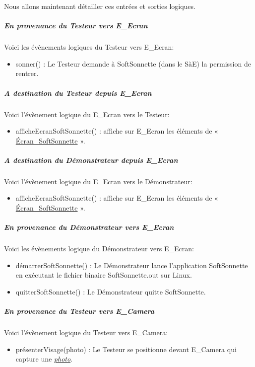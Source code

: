 Nous allons maintenant détailler ces entrées et sorties logiques.

\subparagraph{\textit{En provenance du Testeur vers E\_Ecran}} 
\noindent Voici les évènements logiques du Testeur vers E\_Ecran:

    \begin{itemize}
        \item sonner() : Le Testeur demande à SoftSonnette (dans le SàE) la permission de rentrer.
    \end{itemize}

\subparagraph{\textit{A destination du Testeur depuis E\_Ecran}} 
\noindent Voici l'évènement logique du E\_Ecran vers le Testeur:

    \begin{itemize}
        \item afficheEcranSoftSonnette() : affiche sur E\_Ecran les éléments de « \hyperlink{EcranWebcamConnec}{Écran\_SoftSonnette} ».
    \end{itemize}

\subparagraph{\textit{A destination du Démonstrateur depuis E\_Ecran}} 
\noindent Voici l'évènement logique du E\_Ecran vers le Démonstrateur:

    \begin{itemize}
        \item afficheEcranSoftSonnette() : affiche sur E\_Ecran les éléments de « \hyperlink{EcranWebcamConnec}{Écran\_SoftSonnette} ».
    \end{itemize}

\subparagraph{\textit{En provenance du Démonstrateur vers E\_Ecran}} 
\noindent Voici les évènements logique du Démonstrateur vers E\_Ecran:
    
        \begin{itemize}
            \item démarrerSoftSonnette() : Le Démonstrateur lance l'application SoftSonnette en exécutant le fichier binaire SoftSonnette.out sur Linux.
            \item quitterSoftSonnette() :  Le Démonstrateur quitte SoftSonnette.
        \end{itemize}

\subparagraph{\textit{En provenance du Testeur vers E\_Camera}} 
\noindent Voici l'évènement logique du Testeur vers E\_Camera:

    \begin{itemize}
        \item présenterVisage(photo) : Le Testeur se positionne devant E\_Camera qui capture une \hyperlink{photo}{\textit{photo}}.
    \end{itemize}


